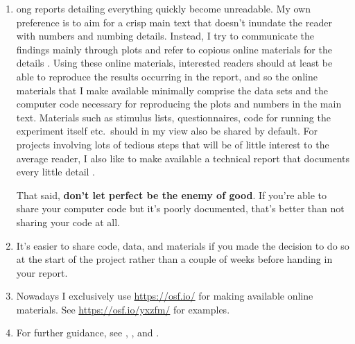 \documentclass[a4paper]{tufte-book}\usepackage[]{graphicx}\usepackage[]{xcolor}
\begin{document}
\begin{enumerate}
  \item ong reports detailing everything quickly become unreadable.
        My own preference
        is to aim for a crisp main text that doesn't inundate the reader
        with numbers and numbing details. Instead, I try to communicate the findings
        mainly through plots and refer to copious online
        materials for the details \citep[also contains further guidance for writing quantitative research reports and some useful references]{Vanhove2020b}. 
        Using these online materials, interested readers should 
        at least be able to reproduce the results occurring in the 
        report, and so the online materials that I make available minimally
        comprise the data sets and the computer code necessary for reproducing
        the plots and numbers in the main text.
        Materials such as stimulus lists, questionnaires, code for running
        the experiment itself etc.\ should in my view also be shared by default.
        For projects involving lots of tedious steps that will be of little
        interest to the average reader, I also like to make available a technical
        report that documents every little detail \citep[e.g.,][]{Vanhove2019}.
        
        That said, \textbf{don't let perfect be the enemy of good}. If you're able to 
        share your computer code but it's poorly documented, that's better than
        not sharing your code at all.
        
  \item It's easier to share code, data, and materials if you made the decision
        to do so at the start of the project rather than a couple of weeks before
        handing in your report.
        
  \item Nowadays I exclusively use \url{https://osf.io/} for making available
        online materials. See \url{https://osf.io/yxzfm/} for examples.
        
 \item For further guidance, 
       see \citet{Klein2018},
       \citet{Levenstein2018},
       and \citet{Soderberg2018}.
\end{enumerate}


\backmatter



\end{document}
